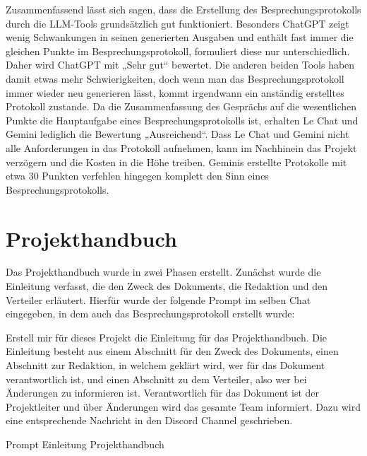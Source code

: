 Zusammenfassend lässt sich sagen, dass die Erstellung des Besprechungsprotokolls durch die LLM-Tools grundsätzlich 
gut funktioniert. Besonders ChatGPT zeigt wenig Schwankungen in seinen generierten Ausgaben und enthält fast immer 
die gleichen Punkte im Besprechungsprotokoll, formuliert diese nur unterschiedlich. Daher wird ChatGPT mit 
„Sehr gut“ bewertet. Die anderen beiden Tools haben damit etwas mehr Schwierigkeiten, doch wenn man das 
Besprechungsprotokoll immer wieder neu generieren lässt, kommt irgendwann ein anständig erstelltes Protokoll 
zustande. Da die Zusammenfassung des Gesprächs auf die wesentlichen Punkte die Hauptaufgabe eines Besprechungsprotokolls 
ist, erhalten Le Chat und Gemini lediglich die Bewertung „Ausreichend“. Dass Le Chat und Gemini nicht alle Anforderungen 
in das Protokoll aufnehmen, kann im Nachhinein das Projekt verzögern und die Kosten in die Höhe treiben. Geminis 
erstellte Protokolle mit etwa 30 Punkten verfehlen hingegen komplett den Sinn eines Besprechungsprotokolls.

\section{Projekthandbuch}  \label{CompProjekthandbuch}

Das Projekthandbuch wurde in zwei Phasen erstellt. Zunächst wurde die Einleitung verfasst, die den Zweck des 
Dokuments, die Redaktion und den Verteiler erläutert. Hierfür wurde der folgende Prompt im selben Chat eingegeben, 
in dem auch das Besprechungsprotokoll erstellt wurde:

\begin{prompt}[H]
    \begin{tcolorbox}[colback=gray!20, colframe=gray!20, boxrule=0pt, sharp corners]
        Erstell mir für dieses Projekt die Einleitung für das Projekthandbuch. Die Einleitung besteht aus einem 
        Abschnitt für den Zweck des Dokuments, einen Abschnitt zur Redaktion, in welchem geklärt wird, wer für das 
        Dokument verantwortlich ist, und einen Abschnitt zu dem Verteiler, also wer bei Änderungen zu informieren ist. 
        Verantwortlich für das Dokument ist der Projektleiter und über Änderungen wird das gesamte Team informiert. 
        Dazu wird eine entsprechende Nachricht in den Discord Channel geschrieben.
        \vfill
    \end{tcolorbox}
    \caption{Prompt Einleitung Projekthandbuch}
    \label{Prompt Einleitung Projekthandbuch}
\end{prompt}

